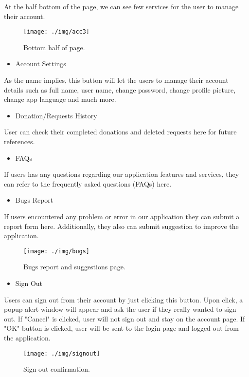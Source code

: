 \documentclass[conference]{IEEEtran}
\begin{document}
At the half bottom of the page, we can see few services for the user to manage their account. 
\begin{figure}[h!]
\texttt{[image: ./img/acc3]}
\centering
\caption{Bottom half of page.}
\end{figure}
\begin{itemize}
\item Account Settings
\end{itemize}
As the name implies, this button will let the users to manage their account details such as full name, user name, change password, change profile picture, change app language and much more.
\begin{itemize}
\item Donation/Requests History
\end{itemize}
User can check their completed donations and deleted requests here for future references.
\begin{itemize}
\item FAQs
\end{itemize}
If users has any questions regarding our application features and services, they can refer to the frequently asked questions (FAQs) here. 
\begin{itemize}
\item Bugs Report
\end{itemize}
If users encountered any problem or error in our application they can submit a report form here. Additionally, they also can submit suggestion to improve the application.

\begin{figure}[h!]
\texttt{[image: ./img/bugs]}
\centering
\caption{Bugs report and suggestions page.}
\end{figure}

\begin{itemize}
\item Sign Out
\end{itemize}
Users can sign out from their account by just clicking this button. Upon click, a popup alert window will appear and ask the user if they really wanted to sign out. If "Cancel" is clicked, user will not sign out and stay on the account page. If "OK" button is clicked, user will be sent to the login page and logged out from the application.

\begin{figure}[h!]
\texttt{[image: ./img/signout]}
\centering
\caption{Sign out confirmation.}
\end{figure}
\end{document}
